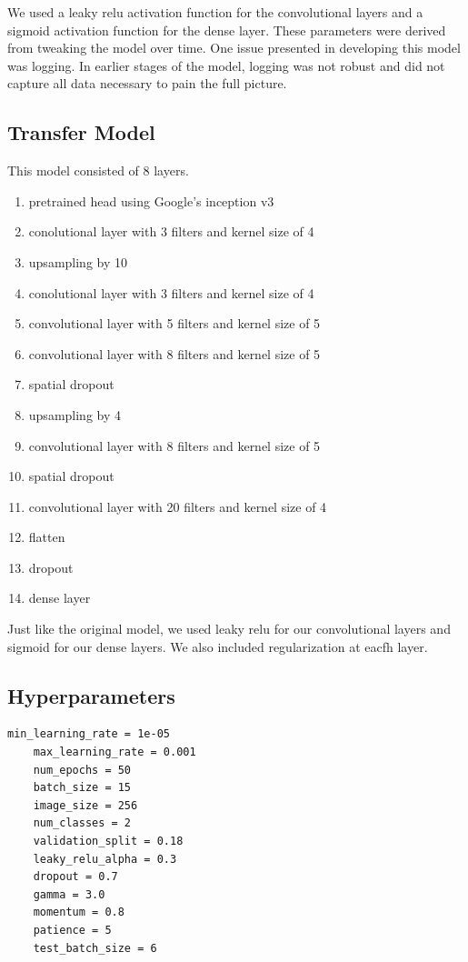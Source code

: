 We used a leaky relu activation function for the convolutional layers and a sigmoid activation function for the dense layer.
These parameters were derived from tweaking the model over time. One issue presented in developing this model was logging. 
In earlier stages of the model, logging was not robust and did not capture all data necessary to pain the full picture. 


\subsection{Transfer Model}
This model consisted of 8 layers. 
\begin{enumerate}
    \item pretrained head using Google's inception v3
    \item conolutional layer with 3 filters and kernel size of 4
    \item upsampling by 10
    \item conolutional layer with 3 filters and kernel size of 4
    \item convolutional layer with 5 filters and kernel size of 5 
    \item convolutional layer with 8 filters and kernel size of 5 
    \item spatial dropout
    \item upsampling by 4 
    \item convolutional layer with 8 filters and kernel size of 5 
    \item spatial dropout 
    \item convolutional layer with 20 filters and kernel size of 4 
    \item flatten 
    \item dropout 
    \item dense layer
\end{enumerate}
Just like the original model, we used leaky relu for our convolutional layers and sigmoid for our dense layers. 
We also included regularization at eacfh layer.
\subsection{Hyperparameters}
\begin{lstlisting}[style=Matlab-editor]
    min_learning_rate = 1e-05
    max_learning_rate = 0.001
    num_epochs = 50
    batch_size = 15
    image_size = 256
    num_classes = 2
    validation_split = 0.18
    leaky_relu_alpha = 0.3
    dropout = 0.7
    gamma = 3.0
    momentum = 0.8
    patience = 5
    test_batch_size = 6
\end{lstlisting}



